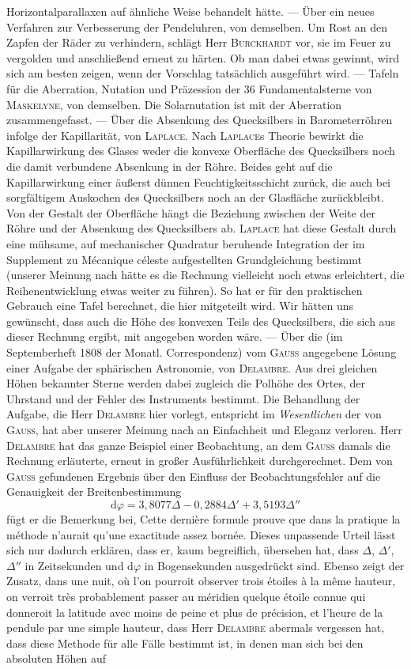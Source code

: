 Horizontalparallaxen auf ähnliche Weise behandelt hätte. --- Über ein neues Verfahren zur Verbesserung der Pendeluhren, von demselben. Um Rost an den Zapfen der Räder zu verhindern, schlägt Herr \textsc{Burckhardt} vor, sie im Feuer zu vergolden und anschließend erneut zu härten. Ob man dabei etwas gewinnt, wird sich am besten zeigen, wenn der Vorschlag tatsächlich ausgeführt wird. --- Tafeln für die Aberration, Nutation und Präzession der 36 Fundamentalsterne von \textsc{Maskelyne}, von demselben. Die Solarnutation ist mit der Aberration zusammengefasst. --- Über die Absenkung des Quecksilbers in Barometerröhren infolge der Kapillarität, von \textsc{Laplace}. Nach \textsc{Laplace}s Theorie bewirkt die Kapillarwirkung des Glases weder die konvexe Oberfläche des Quecksilbers noch die damit verbundene Absenkung in der Röhre. Beides geht auf die Kapillarwirkung einer äußerst dünnen Feuchtigkeitsschicht zurück, die auch bei sorgfältigem Auskochen des Quecksilbers noch an der Glasfläche zurückbleibt. Von der Gestalt der Oberfläche hängt die Beziehung zwischen der Weite der Röhre und der Absenkung des Quecksilbers ab. \textsc{Laplace} hat diese Gestalt durch eine mühsame, auf mechanischer Quadratur beruhende Integration der im Supplement zu Mécanique céleste aufgestellten Grundgleichung bestimmt (unserer Meinung nach hätte es die Rechnung vielleicht noch etwas erleichtert, die Reihenentwicklung etwas weiter zu führen). So hat er für den praktischen Gebrauch eine Tafel berechnet, die hier mitgeteilt wird. Wir hätten uns gewünscht, dass auch die Höhe des konvexen Teils des Quecksilbers, die sich aus dieser Rechnung ergibt, mit angegeben worden wäre. --- Über die (im Septemberheft 1808 der Monatl. Correspondenz) vom \textsc{Gauss} angegebene Lösung einer Aufgabe der sphärischen Astronomie, von \textsc{Delambre}. Aus drei gleichen Höhen bekannter Sterne werden dabei zugleich die Polhöhe des Ortes, der Uhrstand und der Fehler des Instruments bestimmt. Die Behandlung der Aufgabe, die Herr \textsc{Delambre} hier vorlegt, entspricht im \emph{Wesentlichen} der von \textsc{Gauss}, hat aber unserer Meinung nach an Einfachheit und Eleganz verloren. Herr \textsc{Delambre} hat das ganze Beispiel einer Beobachtung, an dem \textsc{Gauss} damals die Rechnung erläuterte, erneut in großer Ausführlichkeit durchgerechnet. Dem von \textsc{Gauss} gefundenen Ergebnis über den Einfluss der Beobachtungsfehler auf die Genauigkeit der Breitenbestimmung  \[ \mathrm{d}\varphi = 3{,}8077\Delta - 0{,}2884\Delta' + 3{,}5193\Delta'' \] fügt er die Bemerkung bei, Cette dernière formule prouve que dans la pratique la méthode n'aurait qu'une exactitude assez bornée. Dieses unpassende Urteil lässt sich nur dadurch erklären, dass er, kaum begreiflich, übersehen hat, dass $\Delta$, $\Delta'$, $\Delta''$ in Zeitsekunden und $\mathrm{d}\varphi$ in Bogensekunden ausgedrückt sind. Ebenso zeigt der Zusatz, dans une nuit, où l'on pourroit observer trois étoiles à la même hauteur, on verroit très probablement passer au méridien quelque étoile connue qui donneroit la latitude avec moins de peine et plus de précision, et l'heure de la pendule par une simple hauteur, dass Herr \textsc{Delambre} abermals vergessen hat, dass diese Methode für alle Fälle bestimmt ist, in denen man sich bei den absoluten Höhen auf 
